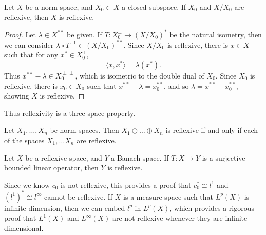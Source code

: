 \begin{theorem}
    Let $X$ be a norm space, and $X_0 \subset X$ a closed subspace. If $X_0$ and $X/X_0$ are reflexive, then $X$ is reflexive.
\end{theorem}
\begin{proof}
    Let $\lambda \in X^{**}$ be given. If $T: X_0^\perp \to (X/X_0)^*$ be the natural isometry, then we can consider $\lambda \circ T^{-1} \in (X/X_0)^{**}$. Since $X/X_0$ is reflexive, there is $x \in X$ such that for any $x^* \in X_0^\perp$,
    \[ \langle x, x^* \rangle = \lambda(x^*). \]
    Thus $x^{**} - \lambda \in X_0^{\perp \perp}$, which is isometric to the double dual of $X_0$. Since $X_0$ is reflexive, there is $x_0 \in X_0$ such that $x^{**} - \lambda = x_0^{**}$, and so $\lambda = x^{**} - x_0^{**}$, showing $X$ is reflexive.
\end{proof}

Thus reflexivity is a three space property.

\begin{corollary}
    Let $X_1, \dots, X_n$ be norm spaces. Then $X_1 \oplus \dots \oplus X_n$ is reflexive if and only if each of the spaces $X_1, \dots X_n$ are reflexive.
\end{corollary}

\begin{corollary}
    Let $X$ be a reflexive space, and $Y$ a Banach space. If $T: X \to Y$ is a surjective bounded linear operator, then $Y$ is reflexive.
\end{corollary}

\begin{example}
    Since we know $c_0$ is not reflexive, this provides a proof that $c_0^* \cong l^1$ and $(l^1)^* \cong l^\infty$ cannot be reflexive. If $X$ is a measure space such that $L^p(X)$ is infinite dimension, then we can embed $l^p$ in $L^p(X)$, which provides a rigorous proof that $L^1(X)$ and $L^\infty(X)$ are not reflexive whenever they are infinite dimensional.
\end{example}

